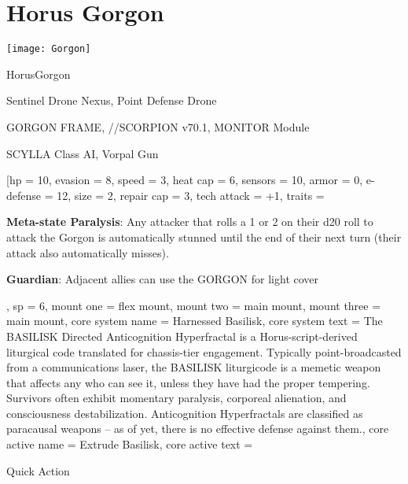 \section{Horus Gorgon}

\begin{center}
    \texttt{[image: Gorgon]}
\end{center}

\begin{mech}{Horus}{Gorgon}


\begin{license}
\item Sentinel Drone Nexus, Point Defense Drone
\item GORGON FRAME,  //SCORPION v70.1, MONITOR Module
\item SCYLLA Class AI, Vorpal Gun
\end{license}


\frameBox
[hp = 10,
evasion = 8,
speed = 3,
heat cap = 6,
sensors = 10,
armor = 0,
e-defense = 12,
size = 2,
repair cap = 3,
tech attack = +1,
traits = {
     \textbf{Meta-state Paralysis}: Any attacker that rolls a 1 or 2 on their d20 roll to attack the Gorgon is automatically stunned until the end of their next turn (their attack also automatically misses).

     \textbf{Guardian}: Adjacent allies can use the GORGON for light cover
     },
sp = 6,
mount one = flex mount,
mount two = main mount,
mount three = main mount,
core system name = Harnessed Basilisk,
core system text = {The BASILISK Directed Anticognition Hyperfractal is a Horus-script-derived liturgical code translated for chassis-tier engagement. Typically point-broadcasted from a communications laser, the BASILISK liturgicode is a memetic weapon that affects any who can see it, unless they have had the proper tempering. Survivors often exhibit momentary paralysis, corporeal alienation, and consciousness destabilization. Anticognition Hyperfractals are classified as paracausal weapons -- as of yet, there is no effective defense against them.},
core active name = Extrude Basilisk,
core active text = {Quick Action

}
\end{mech}
